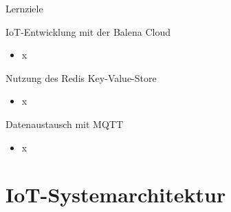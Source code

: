 {
\scriptsize

\begin{frame}{Lernziele}
    \begin{block}{IoT-Entwicklung mit der Balena Cloud}
        \begin{itemize}
            \setlength\itemsep{.5em}

            \item x
        \end{itemize}
    \end{block}

    \begin{block}{Nutzung des Redis Key-Value-Store}
        \begin{itemize}
            \setlength\itemsep{.5em}

            \item x
        \end{itemize}
    \end{block}

    \begin{block}{Datenaustausch mit MQTT}
        \begin{itemize}
            \setlength\itemsep{.5em}

            \item x
        \end{itemize}
    \end{block}
\end{frame}
}

\section{IoT-Systemarchitektur}

